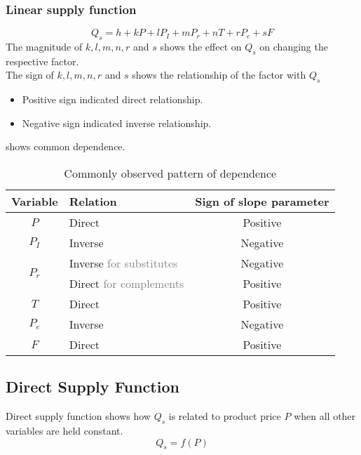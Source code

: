 \documentclass[oneside]{book}
\begin{document}
\subsubsection{Linear supply function}
\[
	Q_s = h + kP + lP_I + mP_r + nT + rP_e + sF
\]
\noindent The magnitude of \(k, l, m, n, r\) and \(s\) shows the effect on \(Q_s\) on changing the respective factor.
\\
\noindent The sign of \(k, l, m, n, r\) and \(s\) shows the relationship of the factor with \(Q_s\)
\begin{itemize}
	\item Positive sign indicated direct relationship.
	\item Negative sign indicated inverse relationship.
\end{itemize}
 shows common dependence.
\begin{table}[ht]
	\centering
	\begin{tabular}{|c|l|c|}
		\hline
		\textbf{Variable}        & \textbf{Relation}                         & \textbf{Sign of slope parameter} \\
		\hline
		\(P\)                    & Direct                                    & Positive                         \\
		\hline
		\(P_I\)                  & Inverse                                   & Negative                         \\
		\hline
		\multirow{2}{*}{\(P_r\)} & Inverse \textcolor{gray}{for substitutes} & Negative                         \\
		\cline{2-3}
		{}                       & Direct \textcolor{gray}{for complements}  & Positive                         \\
		\hline
		\(T\)                    & Direct                                    & Positive                         \\
		\hline
		\(P_e\)                  & Inverse                                   & Negative                         \\
		\hline
		\(F\)                    & Direct                                    & Positive                         \\
		\hline
	\end{tabular}
	\caption{Commonly observed pattern of dependence}
	\label{pattern_of_slopes_in_supply}
\end{table}

\subsection{Direct Supply Function}
Direct supply function shows how \(Q_s\) is related to product price \(P\) when all other variables are held constant.
\[
	Q_s = f(P)
\]
\end{document}
